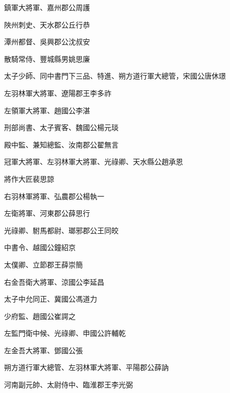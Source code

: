 \begin{pinyinscope}
 鎮軍大將軍、嘉州郡公周護



 陜州刺史、天水郡公丘行恭



 潭州都督、吳興郡公沈叔安



 散騎常侍、豐城縣男姚思廉



 太子少師、同中書門下三品、特進、朔方道行軍大總管，宋國公唐休璟



 左羽林軍大將軍、遼陽郡王李多祚



 左領軍大將軍、趙國公李湛



 刑部尚書、太子賓客、魏國公楊元琰



 殿中監、兼知總監、汝南郡公翟無言



 冠軍大將軍、左羽林軍大將軍、光祿卿、天水縣公趙承恩



 將作大匠裴思諒



 右羽林軍將軍、弘農郡公楊執一



 左衛將軍、河東郡公薛思行



 光祿卿、駙馬都尉、瑯邪郡公王同皎



 中書令、越國公鐘紹京



 太僕卿、立節郡王薛崇簡



 右金吾衛大將軍、涼國公李延昌



 太子中允同正、冀國公馮道力



 少府監、趙國公崔諤之



 左監門衛中候、光祿卿、申國公許輔乾



 左金吾大將軍、鄧國公張



 朔方道行軍大總管、左羽林軍大將軍、平陽郡公薛訥



 河南副元帥、太尉侍中、臨淮郡王李光弼




\end{pinyinscope}
